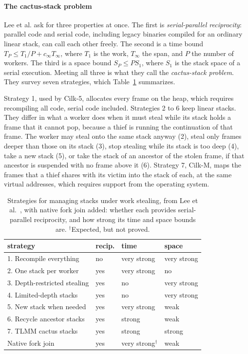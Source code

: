 \documentclass[sigplan,nonacm]{acmart}
\begin{document}
\paragraph{The cactus-stack problem}
%
Lee et al. ask for three properties at once.
%
The first is \emph{serial-parallel reciprocity}: parallel code and
serial code, including legacy binaries compiled for an ordinary linear
stack, can call each other freely.
%
The second is a time bound $T_P \le T_1/P + c_\infty T_\infty$, where
$T_1$ is the work, $T_\infty$ the span, and $P$ the number of workers.
%
The third is a space bound $S_P \le P S_1$, where $S_1$ is the stack
space of a serial execution.
%
Meeting all three is what they call the \emph{cactus-stack problem}.
%
They survey seven strategies, which Table~\ref{tbl:strategies}
summarizes.

Strategy 1, used by Cilk-5, allocates every frame on the heap, which
requires recompiling all code, serial code included.
%
Strategies 2 to 6 keep linear stacks.
%
They differ in what a worker does when it must steal while its stack
holds a frame that it cannot pop, because a thief is running the
continuation of that frame.
%
The worker may steal onto the same stack anyway (2), steal only frames
deeper than those on its stack (3), stop stealing while its stack is
too deep (4), take a new stack (5), or take the stack of an ancestor of
the stolen frame, if that ancestor is suspended with no frame above it
(6).
%
Strategy 7, Cilk-M, maps the frames that a thief shares with its victim
into the stack of each, at the same virtual addresses, which requires
support from the operating system.

\begin{table}
\small
\setlength{\tabcolsep}{3.7pt}
\begin{tabular}{@{}llll@{}}
\toprule
strategy & recip. & time & space \\
\midrule
1. Recompile everything & no & very strong & very strong \\
2. One stack per worker & yes & very strong & no \\
3. Depth-restricted stealing & yes & no & very strong \\
4. Limited-depth stacks & yes & no & very strong \\
5. New stack when needed & yes & very strong & weak \\
6. Recycle ancestor stacks & yes & strong & weak \\
7. TLMM cactus stacks & yes & strong & strong \\
\midrule
Native fork join & yes & very strong$^\dagger$ & weak \\
\bottomrule
\end{tabular}
\caption{Strategies for managing stacks under work stealing, from Lee
  et al.~\cite{lee2010cilk-m}, with native fork join added: whether
  each provides serial-parallel reciprocity, and how strong its time
  and space bounds are.
  $^\dagger$Expected, but not proved.}
\label{tbl:strategies}
\end{table}
\end{document}
